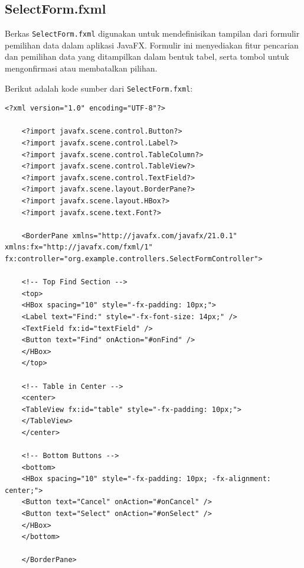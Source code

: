 \subsection{SelectForm.fxml}

Berkas \texttt{SelectForm.fxml} digunakan untuk mendefinisikan tampilan dari formulir pemilihan data dalam aplikasi JavaFX. Formulir ini menyediakan fitur pencarian dan pemilihan data yang ditampilkan dalam bentuk tabel, serta tombol untuk mengonfirmasi atau membatalkan pilihan.

Berikut adalah kode sumber dari \texttt{SelectForm.fxml}:

\begin{lstlisting}[style=XmlStyle]
	<?xml version="1.0" encoding="UTF-8"?>
	
	<?import javafx.scene.control.Button?>
	<?import javafx.scene.control.Label?>
	<?import javafx.scene.control.TableColumn?>
	<?import javafx.scene.control.TableView?>
	<?import javafx.scene.control.TextField?>
	<?import javafx.scene.layout.BorderPane?>
	<?import javafx.scene.layout.HBox?>
	<?import javafx.scene.text.Font?>
	
	<BorderPane xmlns="http://javafx.com/javafx/21.0.1" xmlns:fx="http://javafx.com/fxml/1" fx:controller="org.example.controllers.SelectFormController">
	
	<!-- Top Find Section -->
	<top>
	<HBox spacing="10" style="-fx-padding: 10px;">
	<Label text="Find:" style="-fx-font-size: 14px;" />
	<TextField fx:id="textField" />
	<Button text="Find" onAction="#onFind" />
	</HBox>
	</top>
	
	<!-- Table in Center -->
	<center>
	<TableView fx:id="table" style="-fx-padding: 10px;">
	</TableView>
	</center>
	
	<!-- Bottom Buttons -->
	<bottom>
	<HBox spacing="10" style="-fx-padding: 10px; -fx-alignment: center;">
	<Button text="Cancel" onAction="#onCancel" />
	<Button text="Select" onAction="#onSelect" />
	</HBox>
	</bottom>
	
	</BorderPane>
\end{lstlisting}

